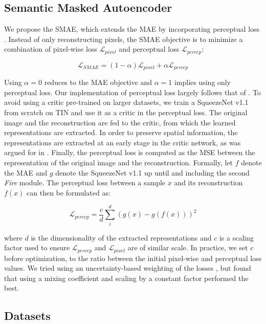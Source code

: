 \subsection{Semantic Masked Autoencoder}
We propose the SMAE, which extends the MAE by incorporating perceptual loss \cite{perceptual}. Instead of only reconstructing pixels, the SMAE objective is to minimize a combination of pixel-wise loss $\mathcal{L}_{pixel}$ and perceptual loss $\mathcal{L}_{percep}$: 

\begin{equation}
    \mathcal{L}_{SMAE} = \left(1-\alpha\right)\mathcal{L}_{pixel} + \alpha\mathcal{L}_{percep}
\end{equation}

Using $\alpha=0$ reduces to the MAE objective and $\alpha=1$ implies using only perceptual loss. Our implementation of perceptual loss largely follows that of \cite{perceptualautoencoder}. To avoid using a critic pre-trained on larger datasets, we train a SqueezeNet v1.1 \cite{squeezenet, torchvision} from scratch on TIN and use it as a critic in the perceptual loss. The original image and the reconstruction are fed to the critic, from which the learned representations are extracted. In order to preserve spatial information, the representations are extracted at an early stage in the critic network, as was argued for in \cite{perceptualautoencoder}. Finally, the perceptual loss is computed as the MSE between the representation of the original image and the reconstruction. Formally, let $f$ denote the MAE and $g$ denote the SqueezeNet v1.1 up until and including the second \textit{Fire} module. The perceptual loss between a sample $x$ and its reconstruction $f(x)$ can then be formulated as:

\begin{equation}
    \mathcal{L}_{percep} = \frac{c}{d}\sum_i^d \left(g(x) - g(f(x))\right)^2
\end{equation}

where $d$ is the dimensionality of the extracted representations and $c$ is a scaling factor used to ensure $\mathcal{L}_{percep}$ and $\mathcal{L}_{pixel}$ are of similar scale. In practice, we set $c$ before optimization, to the ratio between the initial pixel-wise and perceptual loss values. We tried using an uncertainty-based weighting of the losses \cite{uncertainty}, but found that using a mixing coefficient and scaling by a constant factor performed the best.

\subsection{Datasets}

